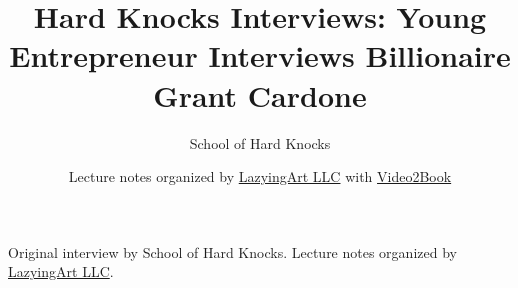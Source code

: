 \documentclass[11pt,oneside]{book}
\begin{document}
\frontmatter
\title{Hard Knocks Interviews: Young Entrepreneur Interviews Billionaire Grant Cardone}
\author{School of Hard Knocks}
\date{Lecture notes organized by \href{https://lazying.art}{LazyingArt LLC} with \href{https://github.com/lachlanchen/Video2Book}{Video2Book}}
\maketitle
\begin{center}
\small Original interview by School of Hard Knocks. Lecture notes organized by \href{https://lazying.art}{LazyingArt LLC}.
\end{center}
\clearpage
\mainmatter

\end{document}
